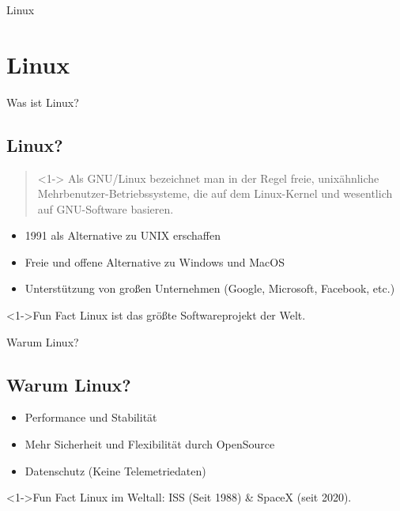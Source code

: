 
\begin{frame}{Linux}
    \section{Linux}\label{sec:Linux}
\end{frame}

\begin{frame}{Was ist Linux?}
    \subsection{Linux?}\label{subsec:linux?}

    \begin{quote}<1->
        Als GNU/Linux bezeichnet man in der Regel freie, unixähnliche Mehrbenutzer-Betriebssysteme, die auf dem Linux-Kernel und wesentlich auf GNU-Software basieren.
    \end{quote}

    \begin{itemize}
        \item<2-> 1991 als Alternative zu UNIX erschaffen
        \item<3-> Freie und offene Alternative zu Windows und MacOS
        \item<4-> Unterstützung von großen Unternehmen (Google, Microsoft, Facebook, etc.)
    \end{itemize}
    \begin{exampleblock}<1->{Fun Fact}
        Linux ist das größte Softwareprojekt der Welt.
    \end{exampleblock}

\end{frame}

\begin{frame}{Warum Linux?}
    \subsection{Warum Linux?}\label{subsec:warum-linux?}

    \begin{itemize}
        \item Performance und Stabilität
        \item Mehr Sicherheit und Flexibilität durch OpenSource
        \item Datenschutz (Keine Telemetriedaten)
    \end{itemize}

    \begin{exampleblock}<1->{Fun Fact}
        Linux im Weltall: ISS (Seit 1988) \& SpaceX (seit 2020).
    \end{exampleblock}

\end{frame}

